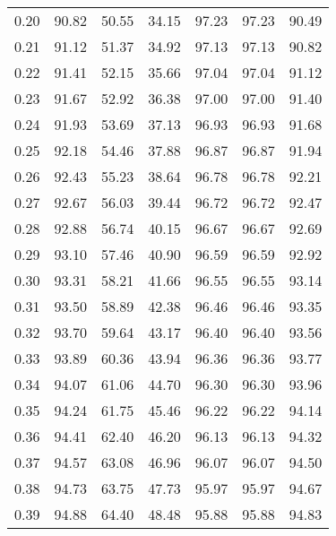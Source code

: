 \begin{tabular}{|c|c|c|c|c|c|c|}
      0.20 &     90.82 &     50.55 &      34.15 &   97.23 &      97.23 &         90.49 \\
      0.21 &     91.12 &     51.37 &      34.92 &   97.13 &      97.13 &         90.82 \\
      0.22 &     91.41 &     52.15 &      35.66 &   97.04 &      97.04 &         91.12 \\
      0.23 &     91.67 &     52.92 &      36.38 &   97.00 &      97.00 &         91.40 \\
      0.24 &     91.93 &     53.69 &      37.13 &   96.93 &      96.93 &         91.68 \\
      0.25 &     92.18 &     54.46 &      37.88 &   96.87 &      96.87 &         91.94 \\
      0.26 &     92.43 &     55.23 &      38.64 &   96.78 &      96.78 &         92.21 \\
      0.27 &     92.67 &     56.03 &      39.44 &   96.72 &      96.72 &         92.47 \\
      0.28 &     92.88 &     56.74 &      40.15 &   96.67 &      96.67 &         92.69 \\
      0.29 &     93.10 &     57.46 &      40.90 &   96.59 &      96.59 &         92.92 \\
      0.30 &     93.31 &     58.21 &      41.66 &   96.55 &      96.55 &         93.14 \\
      0.31 &     93.50 &     58.89 &      42.38 &   96.46 &      96.46 &         93.35 \\
      0.32 &     93.70 &     59.64 &      43.17 &   96.40 &      96.40 &         93.56 \\
      0.33 &     93.89 &     60.36 &      43.94 &   96.36 &      96.36 &         93.77 \\
      0.34 &     94.07 &     61.06 &      44.70 &   96.30 &      96.30 &         93.96 \\
      0.35 &     94.24 &     61.75 &      45.46 &   96.22 &      96.22 &         94.14 \\
      0.36 &     94.41 &     62.40 &      46.20 &   96.13 &      96.13 &         94.32 \\
      0.37 &     94.57 &     63.08 &      46.96 &   96.07 &      96.07 &         94.50 \\
      0.38 &     94.73 &     63.75 &      47.73 &   95.97 &      95.97 &         94.67 \\
      0.39 &     94.88 &     64.40 &      48.48 &   95.88 &      95.88 &         94.83 \\

\end{tabular}
